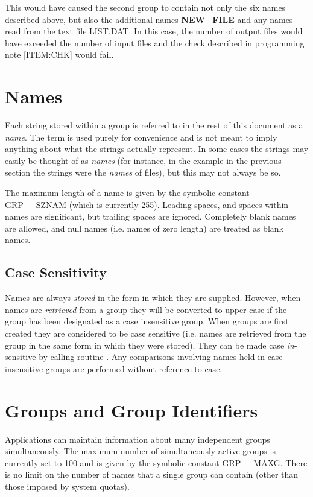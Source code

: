 This would have caused the second group to contain not only the six names
described above, but also the additional names {\bf NEW\_FILE} and any names
read from the text file LIST.DAT. In this case, the number of output files would
have exceeded the number of input files and the check described in programming
note \ref{ITEM:CHK} would fail.

\section{Names}

Each string stored within a group is referred to in the rest of this document as
a {\em name}. The term is used purely for convenience and is not meant to imply
anything about what the strings actually represent. In some cases the strings
may easily be thought of as {\em names} (for instance, in the example
in the previous section the strings were the {\em names} of
files), but this may not always be so.

The maximum length of a name is given by the symbolic constant GRP\_\_SZNAM
(which is currently 255). Leading spaces, and spaces within names are
significant, but trailing spaces are ignored. Completely blank names are
allowed, and null names (i.e. names of zero length) are treated as blank names.

\subsection{\label{SEC:CASE}Case Sensitivity}
Names are always {\em stored} in the form in which they are supplied. However,
when names are {\em retrieved} from a group they will be converted to upper case
if the group has been designated as a case insensitive group. When groups are
first created they are considered to be case sensitive (i.e. names are retrieved
from the group in the same form in which they were stored). They can be made
case {\em in}-sensitive by calling routine . Any comparisons involving
names held in case insensitive groups are performed without reference to case.

\section{Groups and Group Identifiers}

Applications can maintain information about many independent groups
simultaneously. The maximum number of simultaneously active groups is currently
set to 100 and is given by the symbolic constant GRP\_\_MAXG. There is no
limit on the number of names that a single group can contain (other than those
imposed by system quotas).

